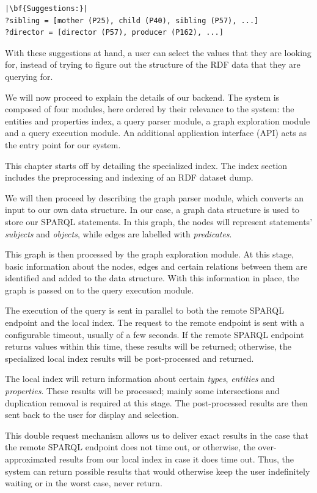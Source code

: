 \begin{verbatim}
|\bf{Suggestions:}|
?sibling = [mother (P25), child (P40), sibling (P57), ...]
?director = [director (P57), producer (P162), ...]
\end{verbatim}

With these suggestions at hand, a user can select the values that they are looking for, instead of trying to figure out the structure of the RDF data that they are querying for.

We will now proceed to explain the details of our backend. The system is composed of four modules, here ordered by their relevance to the system: 
the entities and properties index,
a query parser module,
a graph exploration module and
a query execution module. 
An additional application interface (API) acts as the entry point for our system.

This chapter starts off by detailing the specialized index.
The index section includes the preprocessing and indexing of an RDF dataset dump.

We will then proceed by describing the graph parser module, which converts an input to our own data structure. 
In our case, a graph data structure is used to store our SPARQL statements. 
In this graph, the nodes will represent statements' \textit{subjects} and \textit{objects}, while edges are labelled with \textit{predicates}. 

This graph is then processed by the graph exploration module. 
At this stage, basic information about the nodes, edges and certain relations between them are identified and added to the data structure. 
With this information in place, the graph is passed on to the query execution module. 

The execution of the query is sent in parallel to both the remote SPARQL endpoint and the local index. 
The request to the remote endpoint is sent with a configurable timeout, usually of a few seconds. 
If the remote SPARQL endpoint returns values within this time, these results will be returned; otherwise, the specialized local index results will be post-processed and returned. 

The local index will return information about certain \textit{types}, \textit{entities} and \textit{properties}. 
These results will be processed; mainly some intersections and duplication removal is required at this stage.
The post-processed results are then sent back to the user for display and selection.

This double request mechanism allows us to deliver exact results in the case that the remote SPARQL endpoint does not time out, or otherwise, the over-approximated results from our local index in case it does time out. 
Thus, the system can return possible results that would otherwise keep the user indefinitely waiting or in the worst case, never return. 

